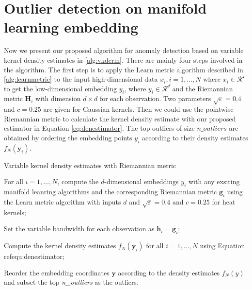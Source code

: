 \documentclass[11pt,a4paper,]{article}
\begin{document}
\hypertarget{outlier-detection-on-manifold-learning-embedding}{%
\section{Outlier detection on manifold learning embedding}\label{outlier-detection-on-manifold-learning-embedding}}

Now we present our proposed algorithm for anomaly detection based on
variable kernel density estimates in \ref{alg:vkderm}. There are mainly
four steps involved in the algorithm. The first step is to apply the
Learn metric algorithm described in \ref{alg:learnmetric} to the input
high-dimensional data \(x_i,i=1,\ldots,N\) where \(x_i\in \mathcal{R^s}\) to
get the low-dimensional embedding \(y_i\), where \(y_i\in \mathcal{R^d}\)
and the Riemannian metric \(\pmb{H}_i\) with dimension \(d\times d\) for
each observation. Two parameters \(\sqrt{\varepsilon} = 0.4\) and \(c=0.25\)
are given for Gaussian kernels. Then we could use the pointwise
Riemannian metric to calculate the kernel density estimate with our
proposed estimator in Equation \eqref{eq:denestimator}. The top outliers
of size \(n\_outliers\) are obtained by ordering the embedding points
\(y_i\) according to their density estimates \(f_N(\pmb{y}_i)\).

\begin{algorithm}[!htb]
  \caption{Variable kernel density estimates with Riemannian metric}
  \label{alg:vkderm}
  \DontPrintSemicolon
  \SetAlgoLined
  \BlankLine
  \begin{algorithmic}[1]

  \STATE For all $i=1,\ldots,N$, compute the $d$-dimensional embeddings $y_i$ with any exsiting manifold leanring algorithms and the corresponding Riemannian metric $\pmb{g}_i$ using the Learn metric algorithm with inputs $d$ and $\sqrt{\varepsilon} = 0.4$ and $c=0.25$ for heat kernels;

  \STATE Set the variable bandwidth for each observation as $\pmb{h}_i = \pmb{g}_i$;

  \STATE Compute the kernel density estimates $f_N(\pmb{y}_i)$ for all $i=1,\ldots,N$ using Equation \\ref{equ:denestimator};

  \STATE Reorder the embedding coordinates $\pmb{y}$ according to the density estimates $f_N(y)$ and subset the top \textit{n\_outliers} as the outliers.

  \end{algorithmic}
\end{algorithm}
\end{document}
